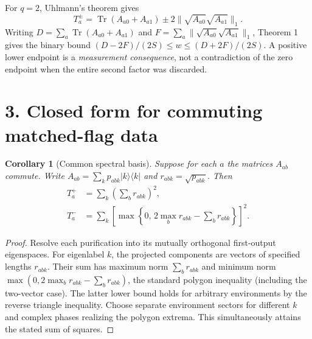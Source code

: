 \documentclass[10pt,letterpaper]{article}
\newtheorem{corollary}{Corollary}
\newcommand{\Tr}{\operatorname{Tr}}
\begin{document}
For $q=2$, Uhlmann's theorem gives
\[
 T_a^\pm=\Tr(A_{a0}+A_{a1})
      \pm2\|\sqrt{A_{a0}}\sqrt{A_{a1}}\|_1.
\]
Writing $D=\sum_a\Tr(A_{a0}+A_{a1})$ and
$F=\sum_a\|\sqrt{A_{a0}}\sqrt{A_{a1}}\|_1$, Theorem 1 gives the binary bound
$(D-2F)/(2S)\le w\le(D+2F)/(2S)$. A positive lower endpoint is a
\emph{measurement consequence}, not a contradiction of the zero endpoint
when the entire second factor was discarded.

\section*{3. Closed form for commuting matched-flag data}
\begin{corollary}[Common spectral basis]
Suppose for each $a$ the matrices $A_{ab}$ commute. Write
$A_{ab}=\sum_k p_{abk}|k\rangle\langle k|$ and $r_{abk}=\sqrt{p_{abk}}$.
Then
\[
\begin{aligned}
 T_a^+&=\sum_k\left(\sum_b r_{abk}\right)^2,\\
 T_a^-&=\sum_k\left[\max\left\{0,\,2\max_b r_{abk}
                                     -\sum_b r_{abk}\right\}\right]^2.
\end{aligned}
\]
\end{corollary}
\begin{proof}
Resolve each purification into its mutually orthogonal first-output
eigenspaces. For eigenlabel $k$, the projected components are vectors of
specified lengths $r_{abk}$. Their sum has maximum norm $\sum_b r_{abk}$
and minimum norm $\max(0,2\max_b r_{abk}-\sum_b r_{abk})$, the standard polygon
inequality (including the two-vector case). The latter lower bound holds
for arbitrary environments by the reverse triangle inequality. Choose
separate environment sectors for different $k$ and complex phases realizing
the polygon extrema. This simultaneously attains the stated sum of squares.
\end{proof}
\end{document}
